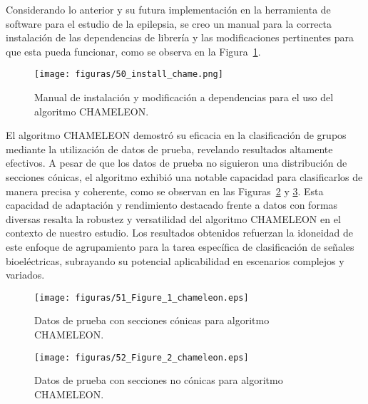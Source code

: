 Considerando lo anterior y su futura implementación en la herramienta de software para el estudio de la epilepsia, se creo un manual para la correcta instalación de las dependencias de librería y las modificaciones pertinentes para que esta pueda funcionar, como se observa en la Figura~\ref{fig: manual_chame}. 

\begin{figure}[H]
    \centering
    \texttt{[image: figuras/50\_install\_chame.png]}
    \caption{Manual de instalación y modificación a dependencias para el uso del algoritmo CHAMELEON.}
    \label{fig: manual_chame}
\end{figure}

El algoritmo CHAMELEON demostró su eficacia en la clasificación de grupos mediante la utilización de datos de prueba, revelando resultados altamente efectivos. A pesar de que los datos de prueba no siguieron una distribución de secciones cónicas, el algoritmo exhibió una notable capacidad para clasificarlos de manera precisa y coherente, como se observan en las Figuras~\ref{fig: chame_conica} y \ref{fig: chame_no_conica}. Esta capacidad de adaptación y rendimiento destacado frente a datos con formas diversas resalta la robustez y versatilidad del algoritmo CHAMELEON en el contexto de nuestro estudio. Los resultados obtenidos refuerzan la idoneidad de este enfoque de agrupamiento para la tarea específica de clasificación de señales bioeléctricas, subrayando su potencial aplicabilidad en escenarios complejos y variados.

\begin{figure}[H]
    \centering
    \texttt{[image: figuras/51\_Figure\_1\_chameleon.eps]}
    \caption{Datos de prueba con secciones cónicas para algoritmo CHAMELEON.}
    \label{fig: chame_conica}
\end{figure}
\begin{figure}[H]
    \centering
    \texttt{[image: figuras/52\_Figure\_2\_chameleon.eps]}
    \caption{Datos de prueba con secciones no cónicas para algoritmo CHAMELEON.}
    \label{fig: chame_no_conica}
\end{figure}